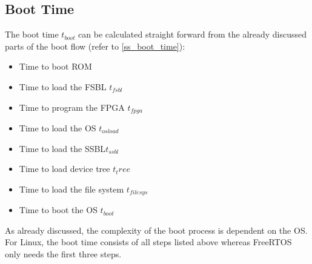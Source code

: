 \subsection{Boot Time} 
The boot time $ t_{boot} $ can be calculated straight forward from the already discussed parts of the boot flow (refer to \ref{ss_boot_time}):
\begin{itemize}
	\item Time to boot \ac{ROM}
	\item Time to load the \ac{FSBL} $ t_{fsbl} $
	\item Time to program the \ac{FPGA} $ t_{fpga} $
	\item Time to load the \ac{OS} $ t_{osload} $
	\item Time to load the \ac{SSBL}$ t_{ssbl} $ 
	\item Time to load device tree $t_tree $
	\item Time to load the file system $ t_{filesys}$
	\item Time to boot the \ac{OS} $ t_{boot} $
\end{itemize} 
As already discussed, the complexity of the boot process is dependent on the \ac{OS}.
For Linux, the boot time consists of all steps listed above whereas FreeRTOS only needs the first three steps. 
  
